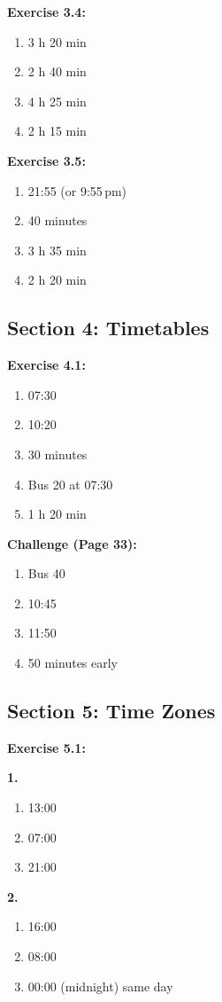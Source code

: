 \documentclass[12pt,a4paper]{article}
\begin{document}
\textbf{Exercise 3.4:}
\begin{enumerate}
\item 3 h 20 min
\item 2 h 40 min
\item 4 h 25 min
\item 2 h 15 min
\end{enumerate}

\textbf{Exercise 3.5:}
\begin{enumerate}
\item 21:55 (or 9:55\,pm)
\item 40 minutes
\item 3 h 35 min
\item 2 h 20 min
\end{enumerate}

\subsection{Section 4: Timetables}

\textbf{Exercise 4.1:}
\begin{enumerate}
\item 07:30
\item 10:20
\item 30 minutes
\item Bus 20 at 07:30
\item 1 h 20 min
\end{enumerate}

\textbf{Challenge (Page 33):}
\begin{enumerate}[label=\alph*)]
\item Bus 40
\item 10:45
\item 11:50
\item 50 minutes early
\end{enumerate}

\subsection{Section 5: Time Zones}

\textbf{Exercise 5.1:}

\textbf{1.}
\begin{enumerate}[label=\alph*)]
\item 13:00
\item 07:00
\item 21:00
\end{enumerate}

\textbf{2.}
\begin{enumerate}[label=\alph*)]
\item 16:00
\item 08:00
\item 00:00 (midnight) same day
\end{enumerate}
\end{document}
